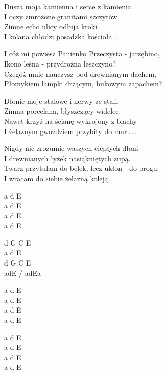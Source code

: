 \begin{text}
Dusza moja kamienna i serce z kamienia.\\
I oczy zmrożone granitami szczytów.\\
Zimne echo ulicy odbija kroki\\
I kolana chłodzi posadzka kościoła...

\vin I cóż mi powiesz Panienko Przeczysta - jarzębino,\\
\vin Ikono leśna - przydrożna leszczyno?\\
\vin Czegóż mnie nauczysz pod drewnianym dachem,\\
\vin Płomykiem lampki drżącym, bukowym zapachem?

Dłonie moje stalowe i nerwy ze stali.\\
Zimna porcelana, błyszczący widelec.\\
Nawet krzyż na ścianę wykrojony z blachy\\
I żelaznym gwoździem przybity do muru...

Nigdy nie zrozumie waszych ciepłych dłoni\\
I drewnianych łyżek nasiąkniętych zupą.\\
Twarz przytulam do belek, lecz ukłon - do progu.\\
I wracam do siebie żelazną koleją...
\end{text}
\begin{chord}
    a d E\\
    a d E\\
    a d E\\
    a d E

    d G C E\\
    a d E\\
    d G C E\\
    adE / adEa

    a d E\\
    a d E\\
    a d E\\
    a d E

    a d E\\
    a d E\\
    a d E\\
    a d E
\end{chord}